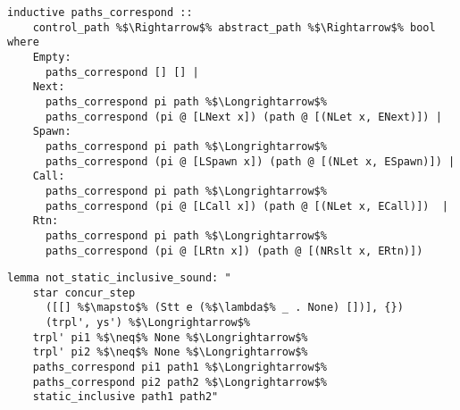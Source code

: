 \documentclass{article}
\begin{document}
\begin{lstlisting}[style=codestyle1, escapechar=\%]
  inductive paths_correspond ::
    control_path %$\Rightarrow$% abstract_path %$\Rightarrow$% bool where
    Empty:
      paths_correspond [] [] |
    Next:
      paths_correspond pi path %$\Longrightarrow$%
      paths_correspond (pi @ [LNext x]) (path @ [(NLet x, ENext)]) |
    Spawn:
      paths_correspond pi path %$\Longrightarrow$%
      paths_correspond (pi @ [LSpawn x]) (path @ [(NLet x, ESpawn)]) |
    Call:
      paths_correspond pi path %$\Longrightarrow$%
      paths_correspond (pi @ [LCall x]) (path @ [(NLet x, ECall)])  |
    Rtn:
      paths_correspond pi path %$\Longrightarrow$%
      paths_correspond (pi @ [LRtn x]) (path @ [(NRslt x, ERtn)]) 
  \end{lstlisting}

\begin{lstlisting}[style=codestyle1, escapechar=\%]
  lemma not_static_inclusive_sound: "
    star concur_step
      ([[] %$\mapsto$% (Stt e (%$\lambda$% _ . None) [])], {})
      (trpl', ys') %$\Longrightarrow$% 
    trpl' pi1 %$\neq$% None %$\Longrightarrow$% 
    trpl' pi2 %$\neq$% None %$\Longrightarrow$% 
    paths_correspond pi1 path1 %$\Longrightarrow$%
    paths_correspond pi2 path2 %$\Longrightarrow$%
    static_inclusive path1 path2"

  \end{lstlisting}
\end{document}

